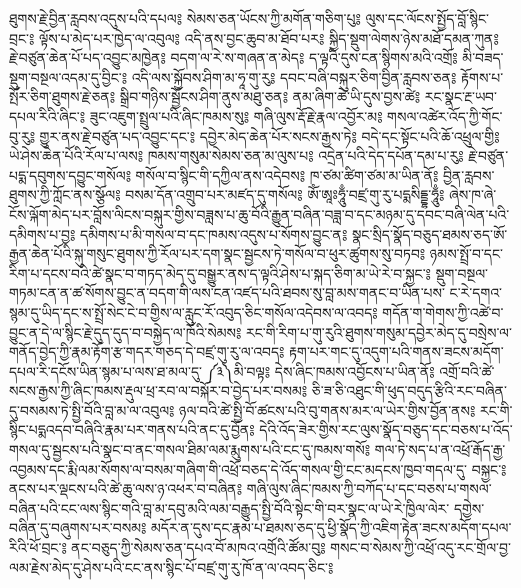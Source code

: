 ཐུགས་རྗེ་བྱིན་རླབས་འདུས་པའི་དཔལ༔
སེམས་ཅན་ཡོངས་ཀྱི་མགོན་གཅིག་པུ༔
ལུས་དང་ལོངས་སྤྱོད་བློ་སྙིང་བྲང་༔
ལྟོས་པ་མེད་པར་ཁྱེད་ལ་འབུལ༔
འདི་ནས་བྱང་ཆུབ་མ་ཐོབ་པར༔
སྐྱིད་སྡུག་ལེགས་ཉེས་མཐོ་དམན་ཀུན༔
རྗེ་བཙུན་ཆེན་པོ་པད་འབྱུང་མཁྱེན༔
བདག་ལ་རེ་ས་གཞན་ན་མེད༔
ད་ལྟའི་དུས་ངན་སྙིགས་མའི་འགྲོ༔
མི་བཟད་སྡུག་བསྔལ་འདམ་དུ་བྱིང་༔
འདི་ལས་སྐྱོབས་ཤིག་མ་ཧཱ་གུ་རུ༔
དབང་བཞི་བསྐུར་ཅིག་བྱིན་རླབས་ཅན༔
རྟོགས་པ་སྤོར་ཅིག་ཐུགས་རྗེ་ཅན༔
སྒྲིབ་གཉིས་སྦྱོངས་ཤིག་ནུས་མཐུ་ཅན༔
ནམ་ཞིག་ཚེ་ཡི་དུས་བྱས་ཚེ༔
རང་སྣང་རྔ་ཡབ་དཔལ་རིའི་ཞིང་༔
ཟུང་འཇུག་སྤྲུལ་པའི་ཞིང་ཁམས་སུ༔
གཞི་ལུས་རྡོ་རྗེ་རྣལ་འབྱོར་མ༔
གསལ་འཚེར་འོད་ཀྱི་གོང་བུ་རུ༔
གྱུར་ནས་རྗེ་བཙུན་པད་འབྱུང་དང་༔
དབྱེར་མེད་ཆེན་པོར་སངས་རྒྱས་ཏེ༔
བདེ་དང་སྟོང་པའི་ཆོ་འཕྲུལ་གྱི༔
ཡེ་ཤེས་ཆེན་པོའི་རོལ་པ་ལས༔
ཁམས་གསུམ་སེམས་ཅན་མ་ལུས་པ༔
འདྲེན་པའི་དེད་དཔོན་དམ་པ་རུ༔
རྗེ་བཙུན་པདྨ་དབུགས་དབྱུང་གསོལ༔
གསོལ་བ་སྙིང་གི་དཀྱིལ་ནས་འདེབས༔
ཁ་ཙམ་ཚིག་ཙམ་མ་ཡིན་ནོ༔
བྱིན་རླབས་ཐུགས་ཀྱི་ཀློང་ནས་སྩོལ༔
བསམ་དོན་འགྲུབ་པར་མཛད་དུ་གསོལ༔
ཨོཾ་ཨཱཿཧཱུྃ་བཛྲ་གུ་རུ་པདྨསིདྡྷ་ཧཱུྃ༔
ཞེས་ཁ་ཞེ་ངོས་ལྐོག་མེད་པར་བློས་ལིངས་བསྐུར་གྱིས་བཟླས་པ་ཆུ་བོའི་རྒྱུན་བཞིན་བཟླ་བ་དང་མཉམ་དུ་དབང་བཞི་ལེན་པའི་དམིགས་པ་བྱ༔
དམིགས་པ་མི་གསལ་བ་དང་ཁམས་འདུས་པ་སོགས་བྱུང་ན༔
སྣང་སྲིད་སྣོད་བཅུད་ཐམས་ཅད་ཨོ་རྒྱན་ཆེན་པོའི་སྐུ་གསུང་ཐུགས་ཀྱི་རོལ་པར་དག་སྣང་སྦྱངས་ཏེ་གསོལ་བ་ཕུར་ཚུགས་སུ་བཏབ༔
ཉམས་སྤྲོ་བ་དང་རིག་པ་དངས་བའི་ཚེ་སྣང་བ་གཏད་མེད་དུ་བསྒྱུར་ནས་ད་ལྟའི་ཤེས་པ་སྐད་ཅིག་མ་ཡེ་རེ་བ་སྐྱང་༔
སྡུག་བསྔལ་གཏམ་ངན་ན་ཚ་སོགས་བྱུང་ན་བདག་གི་ལས་ངན་འཛད་པའི་ཐབས་སུ་བླ་མས་གནང་བ་ཡིན་པས་
   ང་རེ་དགའ་སྙམ་དུ་ཡིད་དང་ས་སྤྲོ་སེང་ངེ་བ་གྱིས་ལ་རླུང་རོ་འབུད་ཅིང་གསོལ་འདེབས་ལ་འབད༔
གདོན་ག་གེགས་ཀྱི་འཚེ་བ་བྱུང་ན་དེ་ལ་སྙིང་རྗེ་དུད་དུད་བ་བསྐྱེད་ལ་ཁོའི་སེམས༔
རང་གི་རིག་པ་གུ་རུའི་ཐུགས་གསུམ་དབྱེར་མེད་དུ་བསྲེས་ལ་གནོད་བྱེད་ཀྱི་རྣམ་རྟོག་རྩ་གདར་གཅད་དེ་བཛྲ་གུ་རུ་ལ་འབད༔
རྟག་པར་གང་དུ་འདུག་པའི་གནས་ཟངས་མདོག་དཔལ་རི་དངོས་ཡིན་སྙམ་པ་ལས་ཐ་མལ་དུ་
༼༣༽མི་བལྟ༔
དེས་ཞིང་ཁམས་འབྱོངས་པ་ཡིན་ནོ༔
འགྲོ་བའི་ཚེ་སངས་རྒྱས་ཀྱི་ཞིང་ཁམས་རྡུལ་ཕྲ་རབ་ལ་བསྐོར་བ་བྱེད་པར་བསམ༔
ཅི་ཟ་ཅི་འཐུང་གི་ཕུད་བདུད་རྩིའི་རང་བཞིན་དུ་བསམས་ཏེ་སྤྱི་བོའི་བླ་མ་ལ་འབུལ༔
ཉལ་བའི་ཚེ་སྤྱི་བོ་ཚངས་པའི་བུ་གནས་མར་ལ་ཡེར་གྱིས་བྱོན་ནས༔
རང་གི་སྙིང་པདྨའདབ་བཞིའི་རྣམ་པར་གནས་པའི་ནང་དུ་བྱོན༔
དེའི་འོད་ཟེར་གྱིས་རང་ལུས་སྣོད་བཅུད་དང་བཅས་པ་འོད་
  གསལ་དུ་སྦྱངས་པའི་སྣང་བ་ནང་གསལ་ཐིམ་ལམ་རྨུགས་པའི་ངང་དུ་ཁམས་གསོ༔
གལ་ཏེ་སད་པ་ན་འཕྲོ་རྒོད་རྒྱ་འབྱམས་དང་རྨི་ལམ་སོགས་ལ་བསམ་གཞིག་གི་འཕྲོ་བཅད་དེ་འོད་གསལ་གྱི་ངང་མདངས་ཁྱབ་གདལ་དུ་
  བསྐྱང་༔
ནངས་པར་ལྡངས་པའི་ཚེ་ཆུ་ལས་ཉ་འཕར་བ་བཞིན༔
གཞི་ལུས་ཞིང་ཁམས་ཀྱི་བཀོད་པ་དང་བཅས་པ་གསལ་བཞིན་པའི་ངང་ལས་སྙིང་གའི་བླ་མ་དབུ་མའི་ལམ་བརྒྱུད་སྤྱི་བོའི་སྟེང་གི་བར་སྣང་ལ་ཡེ་རེ་ཁྱིལ་ལེར་
  དགྱེས་བཞིན་དུ་བཞུགས་པར་བསམ༔
མདོར་ན་དུས་དང་རྣམ་པ་ཐམས་ཅད་དུ་ཕྱི་སྣོད་ཀྱི་འཇིག་རྟེན་ཟངས་མདོག་དཔལ་རིའི་ཕོ་བྲང་༔
ནང་བཅུད་ཀྱི་སེམས་ཅན་དཔའ་བོ་མཁའ་འགྲོའི་ཚོམ་བུ༔
གསང་བ་སེམས་ཀྱི་འཕྲོ་འདུ་རང་གྲོལ་བྱ་ལམ་རྗེས་མེད་དུ་ཤེས་པའི་ངང་ནས་སྙིང་པོ་བཛྲ་གུ་རུ་ཁོ་ན་ལ་འབད་ཅིང་༔
